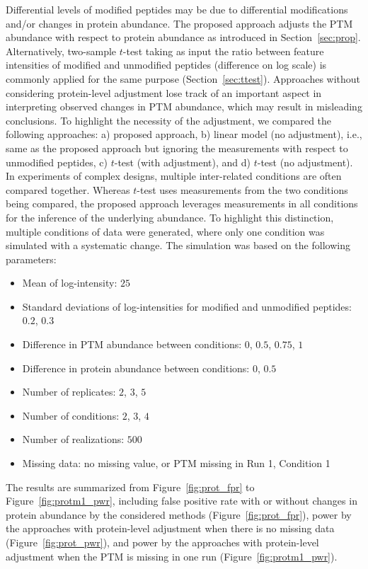 \documentclass{mcp}
\def\sfigref#1{{Figure~\ref{#1}}}
\def\secref#1{Section~\ref{#1}}
\begin{document}
Differential levels of modified peptides may be due to differential modifications and/or changes in protein abundance. The proposed approach adjusts the PTM abundance with respect to protein abundance as introduced in \secref{sec:prop}. Alternatively, two-sample $t$-test taking as input the ratio between feature intensities of modified and unmodified peptides (difference on log scale) is commonly applied for the same purpose (\secref{sec:ttest}). 
Approaches without considering protein-level adjustment lose track of an important aspect in interpreting observed changes in PTM abundance, which may result in misleading conclusions. To highlight the necessity of the adjustment, we compared the following approaches: a) proposed approach, b) linear model (no adjustment), i.e., same as the proposed approach but ignoring the measurements with respect to unmodified peptides, c) $t$-test (with adjustment), and d) $t$-test (no adjustment).
In experiments of complex designs, multiple inter-related conditions are often compared together. Whereas $t$-test uses measurements from the two conditions being compared, the proposed approach leverages measurements in all conditions for the inference of the underlying abundance. To highlight this distinction, multiple conditions of data were generated, where only one condition was simulated with a systematic change. The simulation was based on the following parameters: 
\begin{itemize}
\item Mean of log-intensity: $25$
\item Standard deviations of log-intensities for modified and unmodified peptides: $0.2$, $0.3$
\item Difference in PTM abundance between conditions: $0$, $0.5$, $0.75$, $1$
\item Difference in protein abundance between conditions: $0$, $0.5$
\item Number of replicates: $2$, $3$, $5$
\item Number of conditions: $2$, $3$, $4$
\item Number of realizations: $500$
\item Missing data: no missing value, or PTM missing in Run 1, Condition 1
\end{itemize}
The results are summarized from \sfigref{fig:prot_fpr} to \sfigref{fig:protm1_pwr}, including false positive rate with or without changes in protein abundance by the considered methods (\sfigref{fig:prot_fpr}), power by the approaches with protein-level adjustment when there is no missing data (\sfigref{fig:prot_pwr}), and power by the approaches with protein-level adjustment when the PTM is missing in one run (\sfigref{fig:protm1_pwr}).
\end{document}
